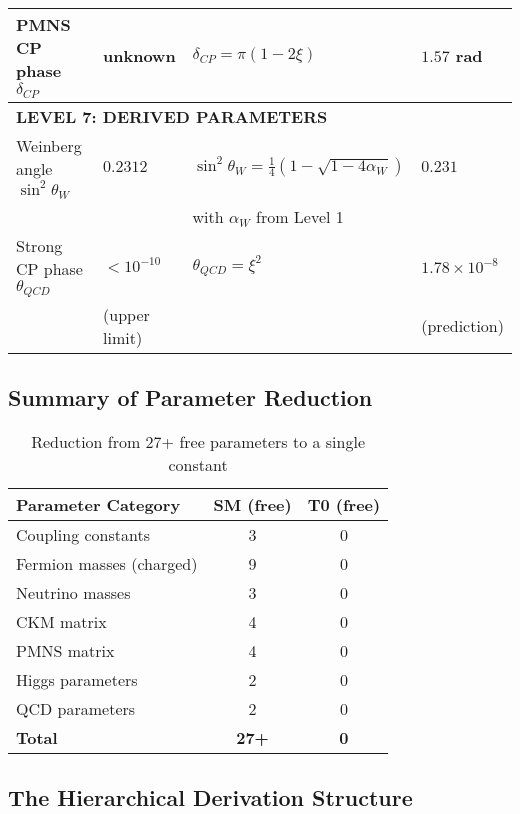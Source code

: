 \documentclass[12pt,a4paper]{article}
\begin{document}
\begin{longtable}{p{5cm}p{4cm}p{3.5cm}p{3.5cm}}
	PMNS CP phase $\delta_{CP}$ & unknown & $\delta_{CP} = \pi(1 - 2\xi)$ & $1.57$ rad \\
	
	\midrule
	\multicolumn{4}{l}{\textbf{LEVEL 7: DERIVED PARAMETERS}} \\
	\midrule
	
	Weinberg angle $\sin^2\theta_W$ & $0.2312$ & $\sin^2\theta_W = \frac{1}{4}(1-\sqrt{1-4\alpha_W})$ & $0.231$ \\
	& & with $\alpha_W$ from Level 1 & \\[0.3em]
	
	Strong CP phase $\theta_{QCD}$ & $< 10^{-10}$ & $\theta_{QCD} = \xi^{2}$ & $1.78 \times 10^{-8}$ \\
	& (upper limit) & & (prediction) \\
	
\end{longtable}

\subsection{Summary of Parameter Reduction}
\label{subsec:reduction_summary}

\begin{table}[h]
	\centering
	\begin{tabular}{lcc}
		\toprule
		\textbf{Parameter Category} & \textbf{SM (free)} & \textbf{T0 (free)} \\
		\midrule
		Coupling constants & 3 & 0 \\
		Fermion masses (charged) & 9 & 0 \\
		Neutrino masses & 3 & 0 \\
		CKM matrix & 4 & 0 \\
		PMNS matrix & 4 & 0 \\
		Higgs parameters & 2 & 0 \\
		QCD parameters & 2 & 0 \\
		\midrule
		\textbf{Total} & \textbf{27+} & \textbf{0} \\
		\bottomrule
	\end{tabular}
	\caption{Reduction from 27+ free parameters to a single constant}
\end{table}

\subsection{The Hierarchical Derivation Structure}
\label{subsec:hierarchical_structure}
\end{document}
